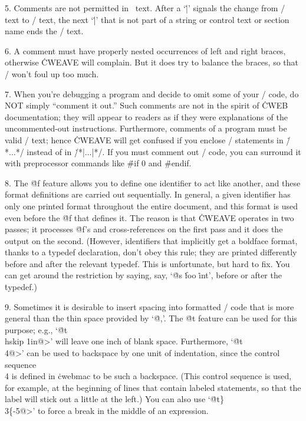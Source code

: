 5. Comments are not permitted in \pb\ text. After a `\.|'
signals the change from \TEX/ text to \CEE/ text, the next `\.|' that is
not part of a string or control text or section name ends the \CEE/ text.

6. A comment must have properly nested occurrences of left and right
braces, otherwise \.{CWEAVE} will complain. But it
does try to balance the braces, so that \TEX/ won't foul up too much.

7. When you're debugging a program and decide to omit some of your
\CEE/ code, do NOT simply ``comment it out.'' Such comments are not
in the spirit of \.{CWEB} documentation; they will appear to readers
as if they were explanations of the uncommented-out instructions.
Furthermore, comments of a program must be valid \TEX/ text; hence
\.{CWEAVE} will get confused if you enclose \CEE/ statements in
\.{/*...*/} instead of in \.{/*|...|*/}.  If you must comment out
\CEE/ code, you can surround it with preprocessor commands
like \.{\#if 0} and \.{\#endif}.

8. The \.{@f} feature allows you to define one identifier to act like
another, and these format definitions are carried out sequentially.
In general, a given identifier has only one printed format
throughout the entire document, and this format is used even before
the \.{@f} that defines it. The reason is that \.{CWEAVE} operates in two
passes; it processes \.{@f}'s and cross-references on the first pass and
it does the output on the second.  (However, identifiers that
implicitly get a boldface format, thanks to a \.{typedef} declaration,
don't obey this rule; they are printed differently before and after
the relevant \.{typedef}.  This is unfortunate, but hard to fix. You can
get around the restriction by saying, say, `\.{@s} \.{foo} \.{int}',
before or after the \.{typedef}.)

9. Sometimes it is desirable to insert spacing into formatted \CEE/ code that
is more general than the thin space provided by `\.{@,}'. The \.{@t} feature
can be used for this purpose; e.g., `\.{@t\\hskip 1in@>}' will
leave one inch of blank space. Furthermore, `\.{@t\\4@>}' can be
used to backspace by one unit of indentation, since the control sequence
\.{\\4} is defined in \.{cwebmac} to be such a backspace. (This
control sequence is used, for example, at the beginning of lines that
contain labeled statements, so that the label will stick out a little at
the left.) You can also use `\.{@t\}\\3\{-5@>}' to force a break
in the middle of an expression.

